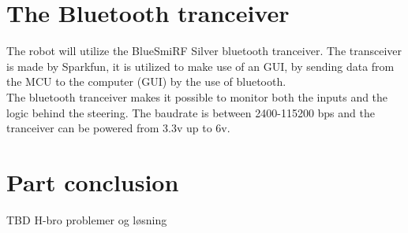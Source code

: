 \section{The Bluetooth tranceiver}
The robot will utilize the BlueSmiRF Silver bluetooth tranceiver. The transceiver is made by Sparkfun, it is utilized to make use of an GUI, by sending data from the MCU to the computer (GUI) by the use of bluetooth.\\ The bluetooth tranceiver makes it possible to monitor both the inputs and the logic behind the steering. The baudrate is between 2400-115200 bps and the tranceiver can be powered from 3.3v up to 6v. 

\section{Part conclusion}
TBD H-bro problemer og løsning